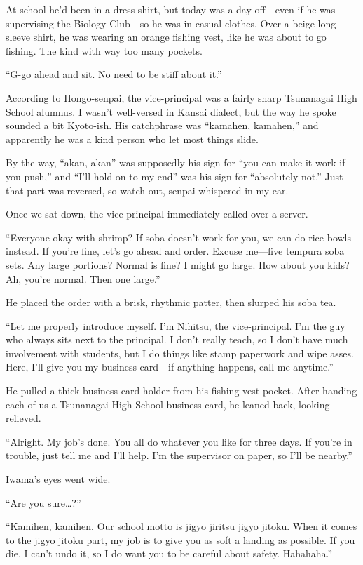 \documentclass[
    a4paper,
    12pt,
    twoside,
    openany,
    UTF8,
    fontset=windows
]{ctexbook}
\begin{document}
At school he'd been in a dress shirt, but today was a day off---even if he was supervising the Biology Club---so he was in casual clothes. Over a beige long-sleeve shirt, he was wearing an orange fishing vest, like he was about to go fishing. The kind with way too many pockets.

``G-go ahead and sit. No need to be stiff about it.''

According to Hongo-senpai, the vice-principal was a fairly sharp Tsunanagai High School alumnus. I wasn't well-versed in Kansai dialect, but the way he spoke sounded a bit Kyoto-ish. His catchphrase was ``kamahen, kamahen,'' and apparently he was a kind person who let most things slide.

By the way, ``akan, akan'' was supposedly his sign for ``you can make it work if you push,'' and ``I'll hold on to my end'' was his sign for ``absolutely not.'' Just that part was reversed, so watch out, senpai whispered in my ear.

Once we sat down, the vice-principal immediately called over a server.

``Everyone okay with shrimp? If soba doesn't work for you, we can do rice bowls instead. If you're fine, let's go ahead and order. Excuse me---five tempura soba sets. Any large portions? Normal is fine? I might go large. How about you kids? Ah, you're normal. Then one large.''

He placed the order with a brisk, rhythmic patter, then slurped his soba tea.

``Let me properly introduce myself. I'm Nihitsu, the vice-principal. I'm the guy who always sits next to the principal. I don't really teach, so I don't have much involvement with students, but I do things like stamp paperwork and wipe asses. Here, I'll give you my business card---if anything happens, call me anytime.''

He pulled a thick business card holder from his fishing vest pocket. After handing each of us a Tsunanagai High School business card, he leaned back, looking relieved.

``Alright. My job's done. You all do whatever you like for three days. If you're in trouble, just tell me and I'll help. I'm the supervisor on paper, so I'll be nearby.''

Iwama's eyes went wide.

``Are you sure\dots?''

``Kamihen, kamihen. Our school motto is jigyo jiritsu jigyo jitoku. When it comes to the jigyo jitoku part, my job is to give you as soft a landing as possible. If you die, I can't undo it, so I do want you to be careful about safety. Hahahaha.''
\end{document}
